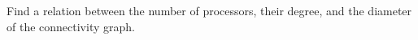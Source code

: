   Find a relation between the number of processors, their degree,
  and the diameter of the connectivity graph.
